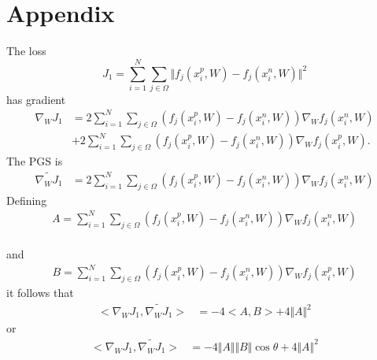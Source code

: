 \documentclass[runningheads]{llncs}
\begin{document}
\renewcommand{\theequation}{A-\arabic{equation}}
\setcounter{equation}{0}  \section*{Appendix}  The loss 
  \begin{equation}
    J_1 = \sum_{i=1}^N \sum_{j \in \Omega}\Vert f_j(x^p_{i},W) - f_j(x^n_{i},W) \Vert^2 
 \end{equation}
 has gradient 
 \begin{equation}
 \begin{split}
   \nabla_W J_{1}& = 2\sum_{i=1}^N \sum_{j \in \Omega}(f_j(x^p_{i},W) - f_j(x^n_{i},W))\nabla_W f_j(x^n_i,W) \\
   &+ 2\sum_{i=1}^N \sum_{j \in \Omega}(f_j(x^p_{i},W) - f_j(x^n_{i},W))\nabla_W f_j(x^p_i,W).
 \end{split}
\end{equation}
 The PGS is 
 \begin{equation}
 \begin{split}
\widetilde{\nabla_W J_{1}}& = 2\sum_{i=1}^N \sum_{j \in \Omega}(f_j(x^p_{i},W) - f_j(x^n_{i},W))\nabla_W f_j(x^n_i,W)
\end{split}
  \end{equation}
  Defining
  \begin{equation}
    \begin{split}
      A = \sum_{i=1}^N \sum_{j \in \Omega}(f_j(x^p_{i},W) - f_j(x^n_{i},W))\nabla_W f_j(x^n_i,W)
    \end{split}
  \end{equation}\\
  and
  \begin{equation}
    \begin{split}
      B = \sum_{i=1}^N \sum_{j \in \Omega}(f_j(x^p_{i},W) - f_j(x^n_{i},W))\nabla_W f_j(x^p_i,W)
    \end{split}
  \end{equation}
  it follows that
  \begin{equation}
 \begin{split}
   <\nabla_W J_{1},\widetilde{\nabla_W J_{1}}>& = -4 <A,B> + 4\Vert A \Vert^2 
 \end{split}
  \end{equation}
 or \begin{equation}
 \begin{split}
<\nabla_W J_{1},\widetilde{\nabla_W J_{1}}>& = -4 \Vert A\Vert \Vert B\Vert \cos{\theta} + 4\Vert A \Vert^2 
\end{split}
  \end{equation}
\end{document}
